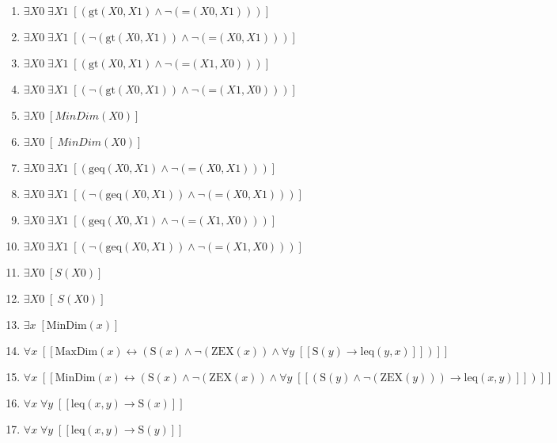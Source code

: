 \documentclass{article}
\begin{document}
\begin{enumerate}
\item $\exists X0\; \exists X1\;  \left[ \left(\textrm{gt}(X0,X1) \land \neg \left(\textrm{=}(X0,X1)\right)\right) \right]$
\item $\exists X0\; \exists X1\;  \left[ \left(\neg \left(\textrm{gt}(X0,X1)\right) \land \neg \left(\textrm{=}(X0,X1)\right)\right) \right]$
\item $\exists X0\; \exists X1\;  \left[ \left(\textrm{gt}(X0,X1) \land \neg \left(\textrm{=}(X1,X0)\right)\right) \right]$
\item $\exists X0\; \exists X1\;  \left[ \left(\neg \left(\textrm{gt}(X0,X1)\right) \land \neg \left(\textrm{=}(X1,X0)\right)\right) \right]$
\item $\exists X0\;  \left[ MinDim(X0) \right]$
\item $\exists X0\;  \left[ ~MinDim(X0) \right]$
\item $\exists X0\; \exists X1\;  \left[ \left(\textrm{geq}(X0,X1) \land \neg \left(\textrm{=}(X0,X1)\right)\right) \right]$
\item $\exists X0\; \exists X1\;  \left[ \left(\neg \left(\textrm{geq}(X0,X1)\right) \land \neg \left(\textrm{=}(X0,X1)\right)\right) \right]$
\item $\exists X0\; \exists X1\;  \left[ \left(\textrm{geq}(X0,X1) \land \neg \left(\textrm{=}(X1,X0)\right)\right) \right]$
\item $\exists X0\; \exists X1\;  \left[ \left(\neg \left(\textrm{geq}(X0,X1)\right) \land \neg \left(\textrm{=}(X1,X0)\right)\right) \right]$
\item $\exists X0\;  \left[ S(X0) \right]$
\item $\exists X0\;  \left[ ~S(X0) \right]$
\item $\exists x\;  \left[ \textrm{MinDim}(x) \right]$
\item $\forall x\;  \left[ \left[ \textrm{MaxDim}(x) \leftrightarrow \left(\textrm{S}(x) \land \neg \left(\textrm{ZEX}(x)\right) \land \forall y\;  \left[ \left[ \textrm{S}(y) \rightarrow \textrm{leq}(y,x) \right] \right]\right) \right] \right]$
\item $\forall x\;  \left[ \left[ \textrm{MinDim}(x) \leftrightarrow \left(\textrm{S}(x) \land \neg \left(\textrm{ZEX}(x)\right) \land \forall y\;  \left[ \left[ \left(\textrm{S}(y) \land \neg \left(\textrm{ZEX}(y)\right)\right) \rightarrow \textrm{leq}(x,y) \right] \right]\right) \right] \right]$
\item $\forall x\; \forall y\;  \left[ \left[ \textrm{leq}(x,y) \rightarrow \textrm{S}(x) \right] \right]$
\item $\forall x\; \forall y\;  \left[ \left[ \textrm{leq}(x,y) \rightarrow \textrm{S}(y) \right] \right]$

\end{enumerate}
\end{document}
